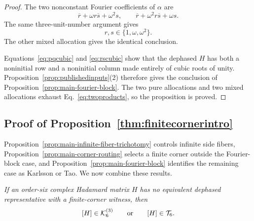 \begin{proof}
The two nonconstant Fourier coefficients of $\alpha$ are
\begin{equation}
\overline r+\omega r\overline s+\omega^2s,
\qquad
\overline r+\omega^2r\overline s+\omega s.
\label{eq:alphahatExplicit}
\end{equation}
The same three-unit-number argument gives
\begin{equation}
r,s\in\{1,\omega,\omega^2\}.
\label{eq:rscubic}
\end{equation}
The other mixed allocation gives the identical conclusion.

Equations~\eqref{eq:pqcubic} and \eqref{eq:rscubic} show that the dephased $H$ has both a noninitial row and a noninitial column made entirely of cubic roots of unity.  {Proposition~\ref{prop:publishedinputs}(2) therefore gives the conclusion of Proposition~\ref{prop:main-fourier-block}.} The two pure allocations and two mixed allocations exhaust Eq.~\eqref{eq:twoproducts}, so the proposition is proved.
\end{proof}

\subsection{{Proof of Proposition~\ref{thm:finitecornerintro}}}
\label{sec:directcompletion}
\label{sec:completion}

{Proposition~\ref{prop:main-infinite-fiber-trichotomy} controls infinite side fibers, Proposition~\ref{prop:main-corner-routing} selects a finite corner outside the Fourier-block case, and Proposition~\ref{prop:main-fourier-block} identifies the remaining case as Karlsson or Tao. We now combine these results.}

{\emph{If an order-six complex Hadamard matrix $H$ has no equivalent dephased representative with a finite-corner witness, then}}
\begin{equation}
{[H]\in\mathcal K_6^{(3)}\qquad\text{or}\qquad[H]\in\mathcal T_6.}
\label{eq:supp-failed-search-routing}
\end{equation}

